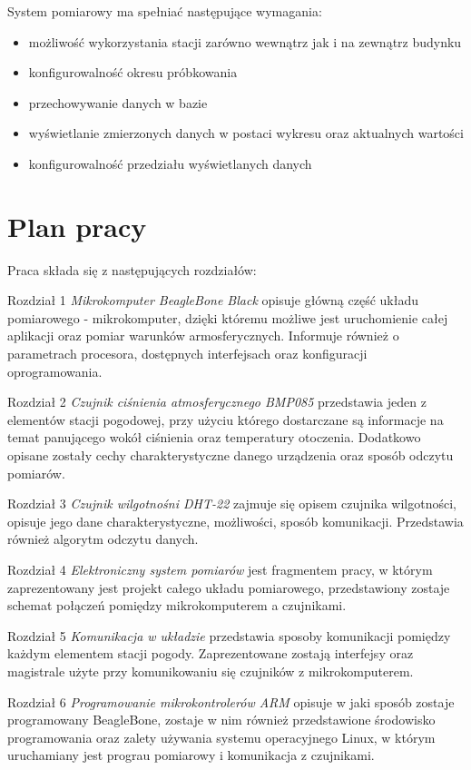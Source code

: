 System pomiarowy ma spełniać następujące wymagania:
\begin{itemize}
\setlength{\itemsep}{2pt} 
\setlength{\parskip}{2pt} 
\setlength{\parsep}{2pt}
\item możliwość wykorzystania stacji zarówno wewnątrz jak i na zewnątrz budynku
\item konfigurowalność okresu próbkowania
\item przechowywanie danych w bazie
\item wyświetlanie zmierzonych danych w postaci wykresu oraz aktualnych wartości
\item konfigurowalność przedziału wyświetlanych danych
\end{itemize}
\section*{Plan pracy}
Praca składa się z następujących rozdziałów:

Rozdział 1 \textit{Mikrokomputer BeagleBone Black} opisuje główną część układu pomiarowego - mikrokomputer, dzięki któremu możliwe jest uruchomienie całej aplikacji oraz pomiar warunków armosferycznych. Informuje również o parametrach procesora, dostępnych interfejsach oraz konfiguracji oprogramowania.


Rozdział 2 \textit{Czujnik ciśnienia atmosferycznego BMP085} przedstawia jeden z elementów stacji pogodowej, przy użyciu którego dostarczane są informacje na temat panującego wokół ciśnienia oraz temperatury otoczenia. Dodatkowo opisane zostały cechy charakterystyczne danego urządzenia oraz sposób odczytu pomiarów.


Rozdział 3 \textit{Czujnik wilgotnośni DHT-22} zajmuje się opisem czujnika wilgotności, opisuje jego dane charakterystyczne, możliwości, sposób komunikacji. Przedstawia również algorytm odczytu danych.


Rozdział 4 \textit{Elektroniczny system pomiarów} jest fragmentem pracy, w którym zaprezentowany jest projekt całego układu pomiarowego, przedstawiony zostaje schemat połączeń pomiędzy mikrokomputerem a czujnikami.


Rozdział 5 \textit{Komunikacja w układzie} przedstawia sposoby komunikacji pomiędzy każdym elementem stacji pogody. Zaprezentowane zostają interfejsy oraz magistrale użyte przy komunikowaniu się czujników z mikrokomputerem.


Rozdział 6 \textit{Programowanie mikrokontrolerów ARM} opisuje w jaki sposób zostaje programowany BeagleBone, zostaje w nim również przedstawione środowisko programowania oraz zalety używania systemu operacyjnego Linux, w którym uruchamiany jest prograu pomiarowy i komunikacja z czujnikami.


